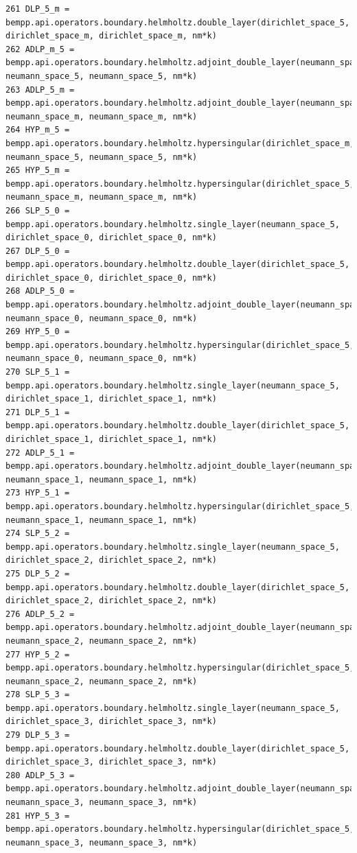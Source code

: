 \documentclass[12pt,letterpaper]{article}
\numberwithin{equation}{section}
\begin{document}
\begin{lstlisting}
261 DLP_5_m = bempp.api.operators.boundary.helmholtz.double_layer(dirichlet_space_5, dirichlet_space_m, dirichlet_space_m, nm*k)
262 ADLP_m_5 = bempp.api.operators.boundary.helmholtz.adjoint_double_layer(neumann_space_m, neumann_space_5, neumann_space_5, nm*k)
263 ADLP_5_m = bempp.api.operators.boundary.helmholtz.adjoint_double_layer(neumann_space_5, neumann_space_m, neumann_space_m, nm*k)
264 HYP_m_5 = bempp.api.operators.boundary.helmholtz.hypersingular(dirichlet_space_m, neumann_space_5, neumann_space_5, nm*k)
265 HYP_5_m = bempp.api.operators.boundary.helmholtz.hypersingular(dirichlet_space_5, neumann_space_m, neumann_space_m, nm*k)
266 SLP_5_0 = bempp.api.operators.boundary.helmholtz.single_layer(neumann_space_5, dirichlet_space_0, dirichlet_space_0, nm*k)
267 DLP_5_0 = bempp.api.operators.boundary.helmholtz.double_layer(dirichlet_space_5, dirichlet_space_0, dirichlet_space_0, nm*k)
268 ADLP_5_0 = bempp.api.operators.boundary.helmholtz.adjoint_double_layer(neumann_space_5, neumann_space_0, neumann_space_0, nm*k)
269 HYP_5_0 = bempp.api.operators.boundary.helmholtz.hypersingular(dirichlet_space_5, neumann_space_0, neumann_space_0, nm*k)
270 SLP_5_1 = bempp.api.operators.boundary.helmholtz.single_layer(neumann_space_5, dirichlet_space_1, dirichlet_space_1, nm*k)
271 DLP_5_1 = bempp.api.operators.boundary.helmholtz.double_layer(dirichlet_space_5, dirichlet_space_1, dirichlet_space_1, nm*k)
272 ADLP_5_1 = bempp.api.operators.boundary.helmholtz.adjoint_double_layer(neumann_space_5, neumann_space_1, neumann_space_1, nm*k)
273 HYP_5_1 = bempp.api.operators.boundary.helmholtz.hypersingular(dirichlet_space_5, neumann_space_1, neumann_space_1, nm*k)
274 SLP_5_2 = bempp.api.operators.boundary.helmholtz.single_layer(neumann_space_5, dirichlet_space_2, dirichlet_space_2, nm*k)
275 DLP_5_2 = bempp.api.operators.boundary.helmholtz.double_layer(dirichlet_space_5, dirichlet_space_2, dirichlet_space_2, nm*k)
276 ADLP_5_2 = bempp.api.operators.boundary.helmholtz.adjoint_double_layer(neumann_space_5, neumann_space_2, neumann_space_2, nm*k)
277 HYP_5_2 = bempp.api.operators.boundary.helmholtz.hypersingular(dirichlet_space_5, neumann_space_2, neumann_space_2, nm*k)
278 SLP_5_3 = bempp.api.operators.boundary.helmholtz.single_layer(neumann_space_5, dirichlet_space_3, dirichlet_space_3, nm*k)
279 DLP_5_3 = bempp.api.operators.boundary.helmholtz.double_layer(dirichlet_space_5, dirichlet_space_3, dirichlet_space_3, nm*k)
280 ADLP_5_3 = bempp.api.operators.boundary.helmholtz.adjoint_double_layer(neumann_space_5, neumann_space_3, neumann_space_3, nm*k)
281 HYP_5_3 = bempp.api.operators.boundary.helmholtz.hypersingular(dirichlet_space_5, neumann_space_3, neumann_space_3, nm*k)

\end{lstlisting}
\end{document}
